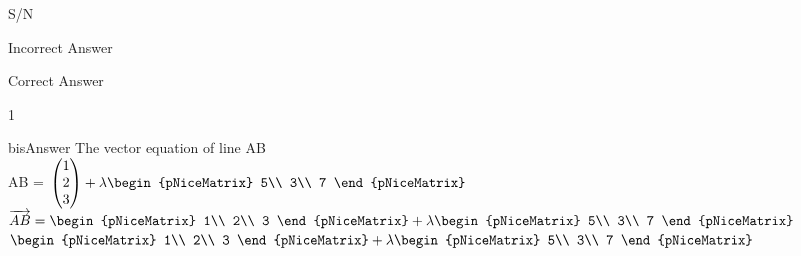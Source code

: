 \clearpage\noindent%


\clearpage\noindent%
\begin{tcbraster}[    raster columns=8,
	                  raster column skip=-0.2pt,
					  colback=white,
					  sharp corners,
					  boxrule=0.3pt,
					  after skip=-0.1pt,
					  raster row skip=-0.1pt,
					  raster equal height=rows,
    				  ]
	\begin{tcolorbox}\begin{center}S/N\end{center}\end{tcolorbox}
	\begin{tcolorbox}[raster multicolumn=4]\begin{center}Incorrect Answer\end{center}\end{tcolorbox}
	\begin{tcolorbox}[raster multicolumn=3]\begin{center}Correct Answer\end{center}\end{tcolorbox}
	\begin{tcolorbox}1\end{tcolorbox}
	\begin{tcolorbox}[raster multicolumn=4]
	    \begin{envCell}{bisAnswer}
   	      The vector equation of line AB\\[5mm] 
		  AB = $\begin{pmatrix} 1\\ 2\\ 3 \end{pmatrix} + \lambda \begin{pNiceMatrix} 5\\ 3\\ 7 \end{pNiceMatrix}  $\\
          $\overrightarrow{AB} = \begin{pNiceMatrix} 1\\ 2\\ 3 \end{pNiceMatrix} + \lambda \begin{pNiceMatrix} 5\\ 3\\ 7 \end{pNiceMatrix}  $\\
		  $\begin{pNiceMatrix} 1\\ 2\\ 3 \end{pNiceMatrix} +  \lambda \begin{pNiceMatrix} 5\\ 3\\ 7 \end{pNiceMatrix} $

\end{envCell}
\end{tcolorbox}
\end{tcbraster}
